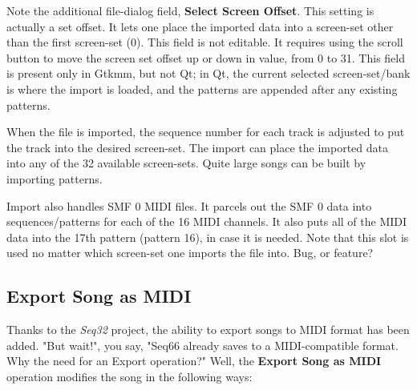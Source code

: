    Note the additional file-dialog field,
   \textbf{Select Screen Offset}.
   This setting is actually a set offset.
   It lets one place the imported data into a screen-set other than
   the first screen-set (0).
   This field is not editable.
   It requires using the scroll button to move the
   screen set offset up or down in value, from 0 to 31.
   This field is present only in Gtkmm, but not Qt;
   in Qt, the current selected screen-set/bank is where the import is loaded,
   and the patterns are appended after any existing patterns.

   When the file is imported, the sequence number for each track is
   adjusted to put the track into the desired screen-set.
   The import can place the imported data into any of the 32 available
   screen-sets.  Quite large songs can be built by importing patterns.

   Import also handles SMF 0 MIDI files.  It parcels out the SMF 0 data
   into sequences/patterns for each of the 16 MIDI channels.  It also puts
   all of the MIDI data into the 17th pattern (pattern 16), in case it is
   needed.  Note that this slot is used no matter which screen-set one imports
   the file into.  Bug, or feature?

\subsection{Export Song as MIDI}
\label{subsec:midi_export_file_export}

   Thanks to the \textsl{Seq32} project, the ability to export songs to MIDI
   format has been added.
   "But wait!", you say, "Seq66 already saves to a MIDI-compatible
   format.  Why the need for an Export operation?"
   Well, the \textbf{Export Song as MIDI} operation modifies the song in the
   following ways:

